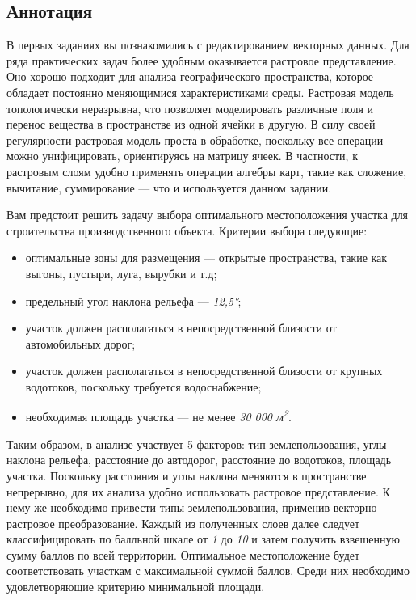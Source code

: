 \documentclass[]{book}
\theoremstyle{definition}
\theoremstyle{definition}
\theoremstyle{definition}
\theoremstyle{remark}
\begin{document}
\hypertarget{weighted-overlay-annotation}{%
\subsection{Аннотация}\label{weighted-overlay-annotation}}

В первых заданиях вы познакомились с редактированием векторных данных.
Для ряда практических задач более удобным оказывается растровое
представление. Оно хорошо подходит для анализа географического
пространства, которое обладает постоянно меняющимися характеристиками
среды. Растровая модель топологически неразрывна, что позволяет
моделировать различные поля и перенос вещества в пространстве из одной
ячейки в другую. В силу своей регулярности растровая модель проста в
обработке, поскольку все операции можно унифицировать, ориентируясь на
матрицу ячеек. В частности, к растровым слоям удобно применять операции
алгебры карт, такие как сложение, вычитание, суммирование --- что и
используется данном задании.

Вам предстоит решить задачу выбора оптимального местоположения участка
для строительства производственного объекта. Критерии выбора следующие:

\begin{itemize}
\item
  оптимальные зоны для размещения --- открытые пространства, такие как
  выгоны, пустыри, луга, вырубки и т.д;
\item
  предельный угол наклона рельефа --- \emph{12,5°};
\item
  участок должен располагаться в непосредственной близости от
  автомобильных дорог;
\item
  участок должен располагаться в непосредственной близости от крупных
  водотоков, поскольку требуется водоснабжение;
\item
  необходимая площадь участка --- не менее \emph{30 000
  м\textsuperscript{2}}.
\end{itemize}

Таким образом, в анализе участвует 5 факторов: тип землепользования,
углы наклона рельефа, расстояние до автодорог, расстояние до водотоков,
площадь участка. Поскольку расстояния и углы наклона меняются в
пространстве непрерывно, для их анализа удобно использовать растровое
представление. К нему же необходимо привести типы землепользования,
применив векторно-растровое преобразование. Каждый из полученных слоев
далее следует классифицировать по балльной шкале от \emph{1} до
\emph{10} и затем получить взвешенную сумму баллов по всей территории.
Оптимальное местоположение будет соответствовать участкам с максимальной
суммой баллов. Среди них необходимо удовлетворяющие критерию минимальной
площади.
\end{document}
